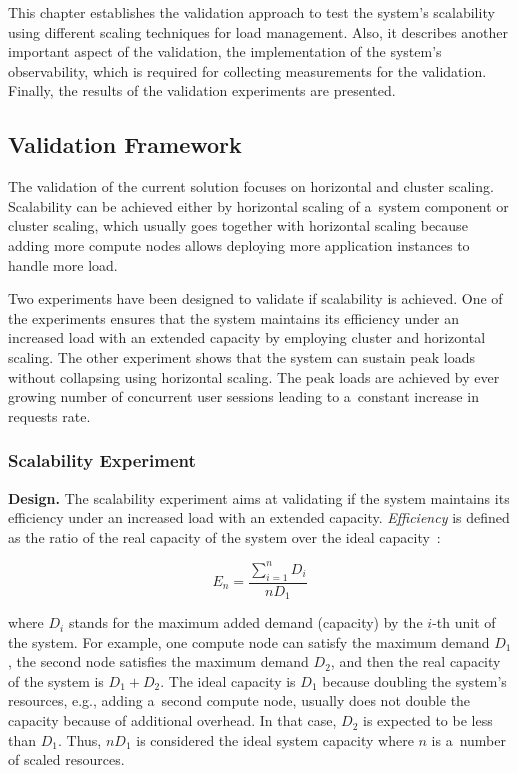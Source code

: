 \documentclass[12pt]{article}
\begin{document}
This chapter establishes the validation approach to test the system's scalability using different scaling techniques for load management. Also, it describes another important aspect of the validation, the implementation of the system's observability, which is required for collecting measurements for the validation. Finally, the results of the validation experiments are presented.

\subsection{Validation Framework} \label{ch:validation_framework}

The validation of the current solution focuses on horizontal and cluster scaling. Scalability can be achieved either by horizontal scaling of a~system component or cluster scaling, which usually goes together with horizontal scaling because adding more compute nodes allows deploying more application instances to handle more load.

Two experiments have been designed to validate if scalability is achieved. 
One of the experiments ensures that the system maintains its efficiency under an increased load with an extended capacity by employing cluster and horizontal scaling. 
The other experiment shows that the system can sustain peak loads without collapsing using horizontal scaling.
The peak loads are achieved by ever growing number of concurrent user sessions leading to a~constant increase in requests rate.
 
\subsubsection{Scalability Experiment}

\textbf{Design.} The scalability experiment aims at validating if the system maintains its efficiency under an increased load with an extended capacity. \emph{Efficiency} is defined as the ratio of the real capacity of the system over the ideal capacity~\cite[p.~14]{weinstock_system_2006}:

\begin{equation} \label{eq:efficiency}
    E_n = \frac{\sum_{i=1}^{n} D_i}{nD_1}
\end{equation}

\noindent
where $D_i$ stands for the maximum added demand (capacity) by the $i$-th unit of the system. For example, one compute node can satisfy the maximum demand $D_1$, the second node satisfies the maximum demand $D_2$, and then the real capacity of the system is $D_1 + D_2$. The ideal capacity is $D_1$ because doubling the system's resources, e.g., adding a~second compute node, usually does not double the capacity because of additional overhead. In that case, $D_2$ is expected to be less than $D_1$. Thus, $nD_1$ is considered the ideal system capacity where $n$ is a~number of scaled resources.
\end{document}

